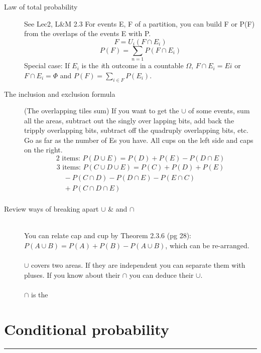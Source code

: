\begin{description}
\item[Law of total probability] See Lec2, L\&M 2.3 \newline
For events E, F of a partition, you can build F or P(F) from the overlaps of the events E with P.
	\[ F = U_i(F \cap E_i)  \]
	\[ P(F) = \sum_{n=1} P(F \cap E_i) \]
Special case: If $E_i$ is the \textit{i}th outcome in a countable $\Omega$, $F \cap E_i = Ei$ 
or $F \cap E_i = \Phi$ and $P(F) = \sum_{i \in F} P(E_i)$. 

\item[The inclusion and exclusion formula] (The overlapping tiles sum)
If you want to get the $\cup$ of some events, sum all the areas, subtract out the singly over lapping bits, add back the tripply overlapping bits, subtract off the quadruply overlapping bits, etc.  Go as far as the number of Es you have. 
All cups on the left side and caps on the right. 
	\[\mbox{2 items: } P(D \cup E) = P(D) + P(E) - P(D \cap E) \]
	\begin{align*}
	\mbox{3 items: }   
	P(C \cup D \cup E) = P(C) + P(D) + P(E) \\
	\quad - P(C \cap D) - P(D \cap E) - P(E \cap C) \\
	\quad + P(C \cap D \cap E) \\
	\end{align*}

\item[Review ways of breaking apart $\cup$ \& and $\cap$] \hfill \\

 You can relate cap and cup {\tiny by Theorem 2.3.6 (pg 28)}:
$P(A \cup B) = P(A) + P(B) - P(A \cup B)$, which can be re-arranged.  \hfill \\
\hfill \\
$\cup$ covers two areas.  If they are independent you can separate them with pluses.  If you know about their $\cap$ you can deduce their $\cup$.  \hfill \\
\hfill \\
$\cap$ is the

\end{description}

\section{Conditional probability}
\smallskip \hrule height 2pt \smallskip

